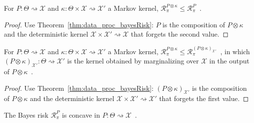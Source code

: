 \begin{lemma}
  \label{lem:bayesRisk_compProd_le_fst}
  \leanok
  For $P : \Theta \rightsquigarrow \mathcal X$ and $\kappa : \Theta \times \mathcal X \rightsquigarrow \mathcal X'$ a Markov kernel, $\mathcal R^{P \otimes \kappa}_\pi \le \mathcal R^{P}_\pi$~.
\end{lemma}

\begin{proof}\leanok
{}
Use Theorem~\ref{thm:data_proc_bayesRisk}: $P$ is the composition of $P \otimes \kappa$ and the deterministic kernel $\mathcal X \times \mathcal X' \rightsquigarrow \mathcal X$ that forgets the second value.
\end{proof}

\begin{lemma}
  \label{lem:bayesRisk_compProd_le_snd}
  For $P : \Theta \rightsquigarrow \mathcal X$ and $\kappa : \Theta \times \mathcal X \rightsquigarrow \mathcal X'$ a Markov kernel, $\mathcal R^{P \otimes \kappa}_\pi \le \mathcal R^{(P \otimes \kappa)_{\mathcal X'}}_\pi$~, in which $(P \otimes \kappa)_{\mathcal X'} : \mathcal \Theta \rightsquigarrow \mathcal X'$ is the kernel obtained by marginalizing over $\mathcal X$ in the output of $P \otimes \kappa$~.
\end{lemma}

\begin{proof}%
{}
Use Theorem~\ref{thm:data_proc_bayesRisk}: $(P \otimes \kappa)_{\mathcal X'}$ is the composition of $P \otimes \kappa$ and the deterministic kernel $\mathcal X \times \mathcal X' \rightsquigarrow \mathcal X'$ that forgets the first value.
\end{proof}

\begin{lemma}
  \label{lem:bayesRisk_concave}
  The Bayes risk $\mathcal R_\pi^P$ is concave in $P : \Theta \rightsquigarrow \mathcal X$~.
\end{lemma}

